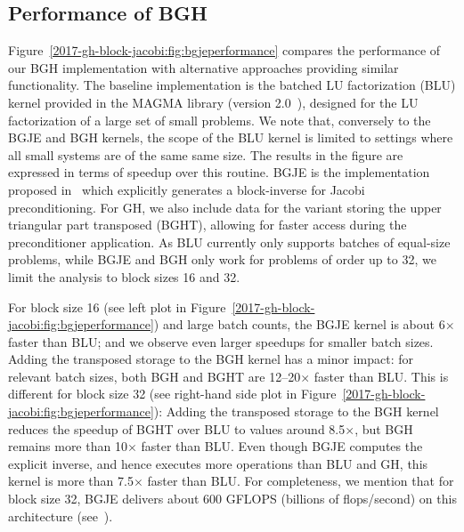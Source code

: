 \subsection{Performance of BGH}
Figure~\ref{2017-gh-block-jacobi:fig:bgjeperformance} compares the performance of our BGH implementation with 
alternative approaches providing similar functionality.
The baseline implementation is the batched LU factorization (BLU) kernel provided in the MAGMA library (version 2.0~\cite{magma}), designed for the LU factorization of a large set of small problems. We note that, conversely to the BGJE and BGH kernels,
the scope of the BLU kernel is limited to settings where all small systems are of the same same size. 
The results in the figure are expressed in terms of speedup over this routine.
BGJE is the implementation proposed in~\cite{gje}
which explicitly generates a block-inverse for Jacobi preconditioning.
For GH, we also include data for the variant storing the upper triangular part transposed (BGHT),
allowing for faster access during the preconditioner application.
As BLU currently only supports batches of equal-size problems, 
while BGJE and BGH only work for  problems of order up to 32,
we limit the analysis to block sizes 16 and 32.

For block size 16 (see left plot in Figure~\ref{2017-gh-block-jacobi:fig:bgjeperformance})
and large batch counts, the BGJE kernel is about 6$\times$ faster than BLU;
and we observe even larger speedups for smaller batch sizes.
Adding the transposed storage to the BGH kernel has a minor impact:
for relevant batch sizes, 
both BGH and BGHT are 
12--20$\times$ faster than BLU.
This is different for block size 32 (see right-hand side plot in Figure~\ref{2017-gh-block-jacobi:fig:bgjeperformance}):
Adding the transposed storage to the BGH kernel reduces 
the speedup of BGHT over BLU to values around 8.5$\times$, but
BGH remains more than 10$\times$ faster than BLU.
Even though BGJE computes the explicit inverse, 
and hence executes more operations than BLU and GH,
this kernel is more than 7.5$\times$ faster than BLU. 
For completeness, we mention that for block size 32, BGJE delivers
about 600 GFLOPS (billions of flops/second) on this architecture (see~\cite{gje}).




